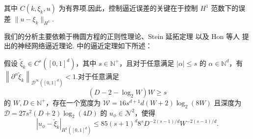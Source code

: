 其中 $C(k, \xi_k, u)$ 为有界项.因此，控制逼近误差的关键在于控制 $H^1$ 范数下的误差 $\|u-\xi_{k}\|_{H^{1}}$.

我们的分析主要依赖于椭圆方程的正则性理论、Stein 延拓定理 \cite{fefferman_2005} 以及 Hon 等人 \cite{hon2022simultaneous,yarotsky2017error} 提出的神经网络逼近理论.\cite{hon2022simultaneous} 中的逼近定理如下所述：
\begin{lemma}\label{th:apperr}
假设 $\tilde{\xi}_{k} \in C^{s}\left([0,1]^{d}\right)$，其中 $s\in \mathbb{N}^{+}$，且对于任意满足 $|\alpha| \leq s$ 的 $\alpha \in \mathbb{N}^{d}$，有 $\left\|\partial^{\alpha} \tilde{\xi}_k\right\|_{\mathcal{D}^{\infty}\left([0,1]^{d}\right)}<1$.对于任意满足 
$$\left(D-2-\log _{2} W\right) W \geq s$$
的 $W,D \in  \mathbb{N}^{+}$，存在一个宽度为 $\mathcal{W}=16 s^{d+1} d(W+2) \log _{2}(8 W)$ 且深度为 $\mathcal{D} = 27 s^{2}(D+2) \log _{2}(4 D)$ 的 $u_{\phi}\in\mathcal{N}^{2}$，使得
\begin{equation*}
|u_{\phi}-\tilde{\xi}_{k}|_{H^{1}\left([0,1]^{d}\right)} \leq 85(s+1)^{d} 8^{s} D^{-2(s-1) / d} W^{-2(s-1) / d}.
\end{equation*}
\end{lemma}

